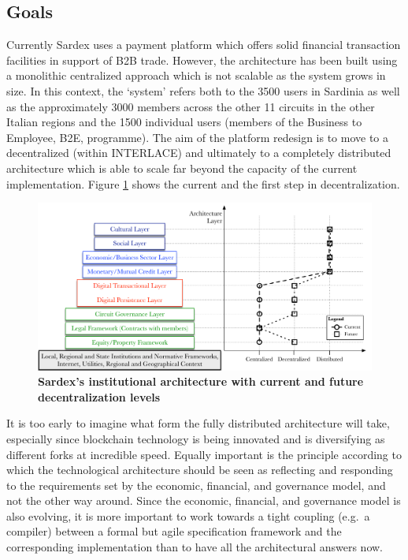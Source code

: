 \subsection{Goals}
Currently Sardex uses a payment platform which offers solid financial transaction facilities in support of B2B trade. However, the architecture has been built using a monolithic centralized approach which is not scalable as the system grows in size. In this context, the `system' refers both to the 3500 users in Sardinia as well as the approximately 3000 members across the other 11 circuits in the other Italian regions and the 1500 individual users (members of the Business to Employee, B2E, programme). The aim of the platform redesign is to move to a decentralized (within INTERLACE) and ultimately to a completely distributed architecture which is able to scale far beyond the capacity of the current implementation. Figure \ref{decentralizedarchitecture} shows the current and the first step in decentralization.
\begin{figure}[htbp]
\centering
\includegraphics[width=16cm]{Figures/Sardex_Institutional_Structure_V3}
\caption{\small\textbf{Sardex's institutional architecture with current and future decentralization levels}}
\label{decentralizedarchitecture}
\end{figure}

It is too early to imagine what form the fully distributed architecture will take, especially since blockchain technology is being innovated and is diversifying as different forks at incredible speed. Equally important is the principle according to which the technological architecture should be seen as reflecting and responding to the requirements set by the economic, financial, and governance model, and not the other way around. Since the economic, financial, and governance model is also evolving, it is more important to work towards a tight coupling (e.g.\ a compiler) between a formal but agile specification framework and the corresponding implementation than to have all the architectural answers now.

